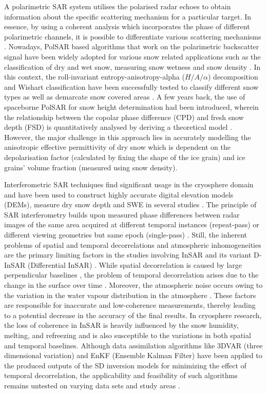 \documentclass[review]{elsarticle}
\numberwithin{equation}{section}
\numberwithin{figure}{section}
\numberwithin{table}{section}
\begin{document}
A polarimetric SAR system utilises the polarised radar echoes to obtain information about the specific scattering mechanism for a particular target. In essence, by using a coherent analysis which incorporates the phase of different polarimetric channels, it is possible to differentiate various scattering mechanisms \citep{Lee2009}. Nowadays, PolSAR based algorithms that work on the polarimetric backscatter signal have been widely adopted for various snow related applications such as the classification of dry and wet snow, measuring snow wetness and snow density \citep{Singh2017, Snehmani2010, Thakur2012, Thakur2017, Usami2016}. In this context, the roll-invariant entropy-anisotropy-alpha ($H/A/{\alpha}$) decomposition and Wishart classification have been successfully tested to classify different snow types as well as demarcate snow covered areas \citep{Cloude2010,Lee2009,Singh2014}. A few years back, the use of spaceborne PolSAR for snow height determination had been introduced, wherein the relationship between the copolar phase difference (CPD) and fresh snow depth (FSD) is quantitatively analysed by deriving a theoretical model \citep{Leinss2014}. However, the major challenge in this approach lies in accurately modelling the anisotropic effective permittivity of dry snow which is dependent on the depolarisation factor (calculated by fixing the shape of the ice grain) and ice grains’ volume fraction (measured using snow density).

Interferometric SAR techniques find significant usage in the cryosphere domain and have been used to construct highly accurate digital elevation models (DEMs), measure dry snow depth and SWE in several studies \citep{Guneriussen2001, Lei2016, Leinss2015, Li2017, Liu2017}. The principle of SAR interferometry builds upon measured phase differences between radar images of the same area acquired at different temporal instances (repeat-pass) or different viewing geometries but same epoch (single-pass) \citep{Hanssen2001}. Still, the inherent problems of spatial and temporal decorrelations and atmospheric inhomogeneities are the primary limiting factors in the studies involving InSAR and its variant D-InSAR (Differential InSAR) \citep{Pepe2017}. While spatial decorrelation is caused by large perpendicular baselines \citep{Pepe2017}, the problem of temporal decorrelation arises due to the change in the surface over time \citep{Leinss2018, Leinss2015}. Moreover, the atmospheric noise occurs owing to the variation in the water vapour distribution in the atmosphere \citep{Hanssen2001}. These factors are responsible for inaccurate and low-coherence measurements, thereby leading to a potential decrease in the accuracy of the final results. In cryosphere research, the loss of coherence in InSAR is heavily influenced by the snow humidity, melting, and refreezing and is also susceptible to the variations in both spatial and temporal baselines. Although data assimilation algorithms like 3DVAR (three dimensional variation) and EnKF (Ensemble Kalman Filter) have been applied to the produced outputs of the SD inversion models for minimizing the effect of temporal decorrelation, the applicability and feasibility of such algorithms remains untested on varying data sets and study areas \citep{Liu2017}.
\end{document}
